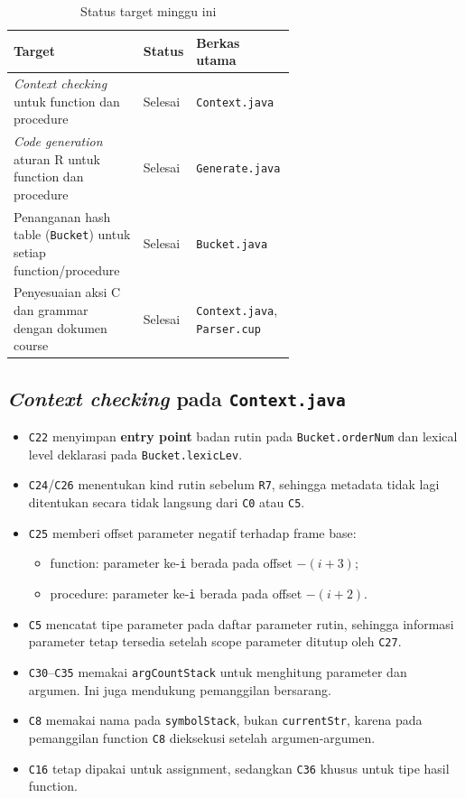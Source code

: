 \documentclass[11pt,a4paper]{article}
\begin{document}
\begin{table}[ht]
\centering
\caption{Status target minggu ini}
\label{tab:target}
\begin{tabularx}{\linewidth}{@{}p{0.46\linewidth}p{0.16\linewidth}X@{}}
\toprule
\textbf{Target} & \textbf{Status} & \textbf{Berkas utama} \\
\midrule
\textit{Context checking} untuk function dan procedure
  & Selesai & \texttt{Context.java} \\
\textit{Code generation} aturan R untuk function dan procedure
  & Selesai & \texttt{Generate.java} \\
Penanganan hash table (\texttt{Bucket}) untuk setiap function/procedure
  & Selesai & \texttt{Bucket.java} \\
Penyesuaian aksi C dan grammar dengan dokumen course
  & Selesai & \texttt{Context.java}, \texttt{Parser.cup} \\
\bottomrule
\end{tabularx}
\end{table}

\subsection{\textit{Context checking} pada \texttt{Context.java}}

\begin{itemize}
  \item \texttt{C22} menyimpan \textbf{entry point} badan rutin pada
        \texttt{Bucket.orderNum} dan lexical level deklarasi pada
        \texttt{Bucket.lexicLev}.
  \item \texttt{C24}/\texttt{C26} menentukan kind rutin sebelum
        \texttt{R7}, sehingga metadata tidak lagi ditentukan secara
        tidak langsung dari \texttt{C0} atau \texttt{C5}.
  \item \texttt{C25} memberi offset parameter negatif terhadap frame
        base:
        \begin{itemize}
          \item function: parameter ke-\texttt{i} berada pada offset
                $-(i + 3)$;
          \item procedure: parameter ke-\texttt{i} berada pada offset
                $-(i + 2)$.
        \end{itemize}
  \item \texttt{C5} mencatat tipe parameter pada daftar parameter
        rutin, sehingga informasi parameter tetap tersedia setelah
        scope parameter ditutup oleh \texttt{C27}.
  \item \texttt{C30}--\texttt{C35} memakai \texttt{argCountStack}
        untuk menghitung parameter dan argumen. Ini juga mendukung
        pemanggilan bersarang.
  \item \texttt{C8} memakai nama pada \texttt{symbolStack}, bukan
        \texttt{currentStr}, karena pada pemanggilan function
        \texttt{C8} dieksekusi setelah argumen-argumen.
  \item \texttt{C16} tetap dipakai untuk assignment, sedangkan
        \texttt{C36} khusus untuk tipe hasil function.
\end{itemize}
\end{document}
